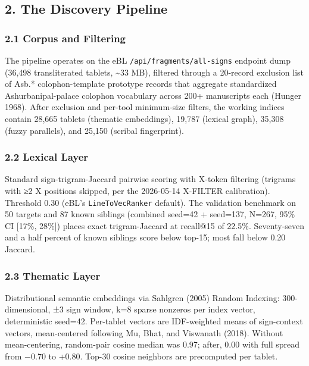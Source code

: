 \documentclass[
  11pt,
  letterpaper,
]{article}
\begin{document}
\subsection{2. The Discovery Pipeline}\label{the-discovery-pipeline}

\subsubsection{2.1 Corpus and Filtering}\label{corpus-and-filtering}

The pipeline operates on the eBL \texttt{/api/fragments/all-signs}
endpoint dump (36,498 transliterated tablets, \textasciitilde33 MB),
filtered through a 20-record exclusion list of Asb.* colophon-template
prototype records that aggregate standardized Ashurbanipal-palace
colophon vocabulary across 200+ manuscripts each (Hunger 1968). After
exclusion and per-tool minimum-size filters, the working indices contain
28,665 tablets (thematic embeddings), 19,787 (lexical graph), 35,308
(fuzzy parallels), and 25,150 (scribal fingerprint).

\subsubsection{2.2 Lexical Layer}\label{lexical-layer}

Standard sign-trigram-Jaccard pairwise scoring with X-token filtering
(trigrams with ≥2 X positions skipped, per the 2026-05-14 X-FILTER
calibration). Threshold 0.30 (eBL's \texttt{LineToVecRanker} default).
The validation benchmark on 50 targets and 87 known siblings (combined
seed=42 + seed=137, N=267, 95\% CI {[}17\%, 28\%{]}) places exact
trigram-Jaccard at recall@15 of 22.5\%. Seventy-seven and a half percent
of known siblings score below top-15; most fall below 0.20 Jaccard.

\subsubsection{2.3 Thematic Layer}\label{thematic-layer}

Distributional semantic embeddings via Sahlgren (2005) Random Indexing:
300-dimensional, ±3 sign window, k=8 sparse nonzeros per index vector,
deterministic seed=42. Per-tablet vectors are IDF-weighted means of
sign-context vectors, mean-centered following Mu, Bhat, and Viswanath
(2018). Without mean-centering, random-pair cosine median was 0.97;
after, 0.00 with full spread from −0.70 to +0.80. Top-30 cosine
neighbors are precomputed per tablet.
\end{document}
